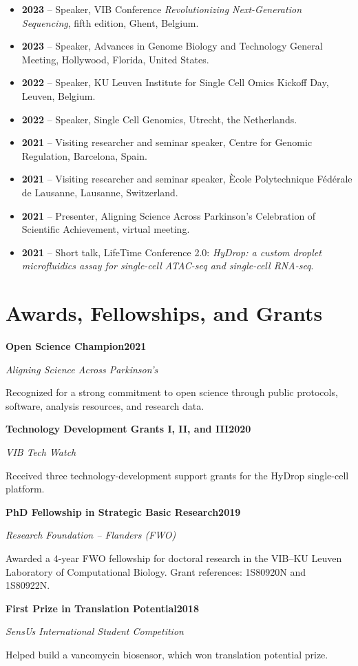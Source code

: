 \documentclass[10pt]{scrartcl}
\newcommand{\cventry}[4]{%
    \needspace{5\baselineskip}%
    {\large\textbf{#1}}\hfill\textbf{#3}\par
    \textit{#2}\par
    \smallskip
    #4\par
    \medskip
}
\begin{document}
\begin{itemize}
    \item \textbf{2023} -- Speaker, VIB Conference \emph{Revolutionizing Next-Generation Sequencing}, fifth edition, Ghent, Belgium.
    \item \textbf{2023} -- Speaker, Advances in Genome Biology and Technology General Meeting, Hollywood, Florida, United States.
    \item \textbf{2022} -- Speaker, KU Leuven Institute for Single Cell Omics Kickoff Day, Leuven, Belgium.
    \item \textbf{2022} -- Speaker, Single Cell Genomics, Utrecht, the Netherlands.
    \item \textbf{2021} -- Visiting researcher and seminar speaker, Centre for Genomic Regulation, Barcelona, Spain.
    \item \textbf{2021} -- Visiting researcher and seminar speaker, \`Ecole Polytechnique F\'ed\'erale de Lausanne, Lausanne, Switzerland.
    \item \textbf{2021} -- Presenter, Aligning Science Across Parkinson's Celebration of Scientific Achievement, virtual meeting.
    \item \textbf{2021} -- Short talk, LifeTime Conference 2.0: \emph{HyDrop: a custom droplet microfluidics assay for single-cell ATAC-seq and single-cell RNA-seq}.
\end{itemize}

\section{Awards, Fellowships, and Grants}

\cventry
    {Open Science Champion}
    {Aligning Science Across Parkinson's}
    {2021}
    {Recognized for a strong commitment to open science through public protocols, software, analysis resources, and research data.}

\cventry
    {Technology Development Grants I, II, and III}
    {VIB Tech Watch}
    {2020}
    {Received three technology-development support grants for the HyDrop single-cell platform.}

\cventry
    {PhD Fellowship in Strategic Basic Research}
    {Research Foundation -- Flanders (FWO)}
    {2019}
    {Awarded a 4-year FWO fellowship for doctoral research in the VIB--KU Leuven Laboratory of Computational Biology. Grant references: 1S80920N and 1S80922N.}

\cventry
    {First Prize in Translation Potential}
    {SensUs International Student Competition}
    {2018}
    {Helped build a vancomycin biosensor, which won translation potential prize.}
\end{document}
